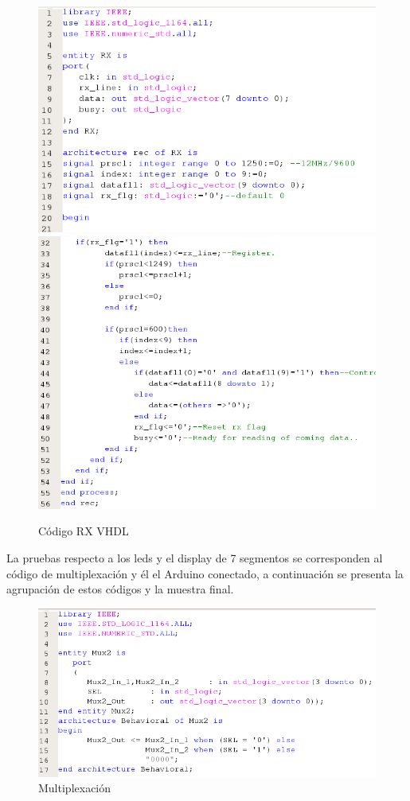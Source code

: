 \documentclass[osajnl,twocolumn,showpacs,superscriptaddress,10pt]{revtex4-1}
\begin{document}
\begin{figure}[H]
    \centering
    \includegraphics[scale=0.4]{images/rx1.png}
    \includegraphics[scale=0.4]{images/rx2.png}
    \caption{Código RX VHDL}
\end{figure}

La pruebas respecto a los leds y el display de 7 segmentos se corresponden al código de multiplexación y él el Arduino conectado, a continuación se presenta la agrupación de estos códigos y la muestra final.

\begin{figure}[H]
    \centering
    \includegraphics[scale=0.4]{images/mutiplexer.png}
    \caption{Multiplexación}
\end{figure}
\end{document}
